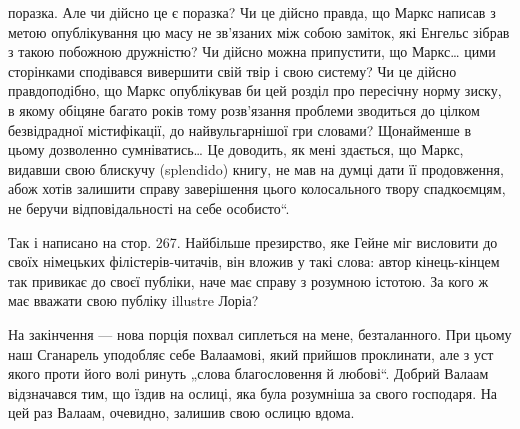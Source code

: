 поразка. Але чи дійсно це є поразка? Чи це дійсно правда, що Маркс написав з метою опублікування цю масу не зв’язаних між
собою заміток, які Енгельс зібрав з такою побожною дружністю? Чи дійсно можна припустити, що Маркс\dots{} цими сторінками
сподівався вивершити свій твір і свою систему? Чи це дійсно правдоподібно, що Маркс опублікував би цей розділ про
пересічну норму зиску, в якому обіцяне багато років тому розв’язання проблеми зводиться до цілком безвідрадної
містифікації, до найвульгарнішої гри словами? Щонайменше в цьому дозволенно сумніватись\dots{} Це доводить, як мені
здається, що Маркс,
видавши свою блискучу (splendido) книгу, не мав на думці дати її продовження, абож хотів залишити справу
заверішення цього колосального твору спадкоємцям, не беручи відповідальності на себе особисто“.

Так і написано на стор. 267. Найбільше презирство, яке Гейне міг висловити до своїх німецьких філістерів-читачів, він вложив
у такі слова: автор кінець-кінцем так привикає до своєї публіки, наче має справу з розумною істотою. За кого ж має вважати
свою публіку illustre Лоріа?

На закінчення — нова порція похвал сиплеться на мене, безталанного. При цьому наш Сганарель уподобляє себе Валаамові, який
прийшов проклинати, але з уст якого проти його волі ринуть „слова благословення й любові“. Добрий Валаам відзначався тим, що
їздив на ослиці, яка була розумніша за свого господаря. На цей раз Валаам, очевидно, залишив свою ослицю вдома.
\parbreak{}  %
